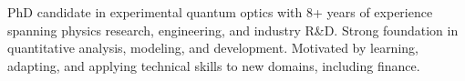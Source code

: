 

\begin{cvparagraph}

PhD candidate in experimental quantum optics with 8+ years of experience spanning physics research, engineering, and industry R\&D. 
Strong foundation in quantitative analysis, modeling, and development. Motivated by learning, adapting, and applying technical skills to new domains, including finance.
\end{cvparagraph}

